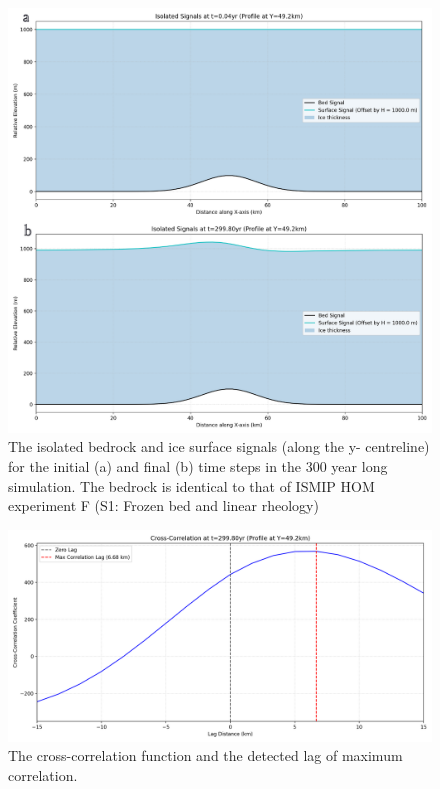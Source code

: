 \begin{figure}[H]
    \includegraphics[scale=0.49]{S1_signals.pdf}
    \caption{The isolated bedrock and ice surface signals (along the y- centreline) for the initial (a) and final (b) time steps in the 300 year long simulation. The bedrock is identical to that of ISMIP HOM experiment F (S1: Frozen bed and linear rheology)}
    \label{fig:phase_analysis_Signals}
\end{figure}

\begin{figure}[H]
    \includegraphics[scale=0.45]{S1_correlation_t_0037.png}
    \caption{The cross-correlation function and the detected lag of maximum correlation.}
    \label{fig:phase_analysis_Cross_Correlation}
\end{figure}


